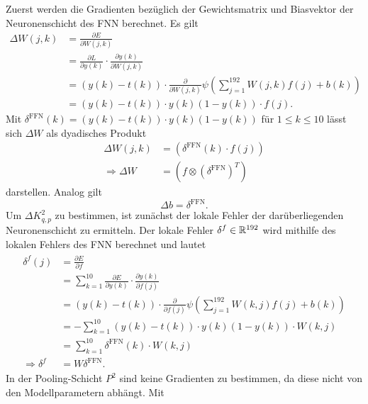 Zuerst werden die Gradienten bezüglich der Gewichtsmatrix und Biasvektor der Neuronenschicht des FNN berechnet. Es gilt
\begin{align*}
        \Delta W(j,k) &=  \frac{\partial E}{\partial W(j,k)}\\
                       &=  \frac{\partial L}{\partial y(k)} \cdot \frac{\partial y(k)}{\partial W(j,k)}\\
                       &= (y(k)-t(k)) \cdot \frac{\partial}{\partial W(j,k)} \psi \left(\sum_{j=1}^{192} W(j,k) f(j)+b(k)\right)\\
                       &= (y(k)-t(k)) \cdot y(k)(1-y(k)) \cdot f(j).
\end{align*}
Mit $\delta^{\text{FFN}}(k)=(y(k)-t(k)) \cdot y(k)(1-y(k))$ für $1 \leq k \leq 10$ lässt sich $\Delta W$ als dyadisches Produkt  
\begin{align*}
    \Delta W(j,k)&= \left(\delta^{\text{FFN}}(k) \cdot f(j) \right) \\
    \Rightarrow  \Delta W&=\left(f \otimes (\delta^{\text{FFN}})^T\right)   
\end{align*}
darstellen. Analog gilt
\begin{equation*}
\Delta b= \delta^{\text{FFN}}.
\end{equation*}
Um $ \Delta K^2_{q,p}$ zu bestimmen, ist zunächst der lokale Fehler der darüberliegenden Neuronenschicht zu ermitteln. Der lokale Fehler $\delta^f \in \mathbb{R}^{192}$ wird mithilfe des lokalen Fehlers des FNN berechnet und lautet
\begin{align}
    \label{eq:delta_f}
    \begin{split}
    \delta^f(j) &=  \frac{\partial E}{\partial f} \\
                &=  \sum_{k=1}^{10} \frac{\partial E}{\partial y(k)} \cdot \frac{\partial y(k)}{\partial f(j)} \\
                &=  (y(k)-t(k)) \cdot \frac{\partial}{\partial f(j)} \psi \left(\sum_{j=1}^{192} W(k,j) f(j) +b(k)\right) \\
                &=-  \sum_{k=1}^{10} (y(k)-t(k)) \cdot y(k)(1-y(k)) \cdot W(k,j) \\
                &=\sum_{k=1}^{10} \delta^{\text{FFN}}(k) \cdot W(k,j) \\
                \Rightarrow \delta^f &= W \delta^{\text{FFN}}.
    \end{split}            
\end{align}
In der Pooling-Schicht $P^2$ sind keine Gradienten zu bestimmen, da diese nicht von den Modellparametern abhängt. Mit
